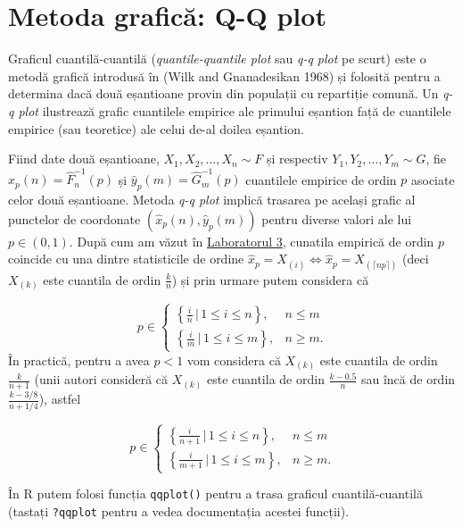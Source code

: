 \documentclass[]{article}
\begin{document}
\section{Metoda grafică: Q-Q plot}\label{metoda-grafica-q-q-plot}

Graficul cuantilă-cuantilă (\emph{quantile-quantile plot} sau \emph{q-q
plot} pe scurt) este o metodă grafică introdusă în (Wilk and
Gnanadesikan 1968) și folosită pentru a determina dacă două eșantioane
provin din populații cu repartiție comună. Un \emph{q-q plot} ilustrează
grafic cuantilele empirice ale primului eșantion față de cuantilele
empirice (sau teoretice) ale celui de-al doilea eșantion.

Fiind date două eșantioane, \(X_1,X_2,\ldots,X_n\sim F\) și respectiv
\(Y_1, Y_2, \ldots, Y_m\sim G\), fie
\(\hat{x}_p(n) = \hat{F}_n^{-1}(p)\) și
\(\hat{y}_p(m) = \hat{G}_m^{-1}(p)\) cuantilele empirice de ordin \(p\)
asociate celor două eșantioane. Metoda \emph{q-q plot} implică trasarea
pe același grafic al punctelor de coordonate
\((\hat{x}_p(n), \hat{y}_p(m))\) pentru diverse valori ale lui
\(p\in(0,1)\). După cum am văzut în
\href{https://alexamarioarei.github.io/Teaching/2017-2018/Instrumente\%20Statistice\%20web\%20page/labs/Lab_3.html}{Laboratorul
3}, cunatila empirică de ordin \(p\) coincide cu una dintre statisticile
de ordine
\(\hat{x}_p = X_{(i)} \iff \hat{x}_p = X_{(\lceil np \rceil)}\) (deci
\(X_{(k)}\) este cuantila de ordin \(\frac{k}{n}\)) și prin urmare putem
considera că

\[
    p\in \left\{\begin{array}{ll}
      \left\{\frac{i}{n}\,|\,1\leq i\leq n\right\}, & n\leq m\\
      \left\{\frac{i}{m}\,|\,1\leq i\leq m\right\}, & n\geq m.
    \end{array}\right.
  \] În practică, pentru a avea \(p<1\) vom considera că \(X_{(k)}\)
este cuantila de ordin \(\frac{k}{n+1}\) (unii autori consideră că
\(X_{(k)}\) este cuantila de ordin \(\frac{k-0.5}{n}\) sau încă de ordin
\(\frac{k-3/8}{n+1/4}\)), astfel

\[
    p\in \left\{\begin{array}{ll}
      \left\{\frac{i}{n+1}\,|\,1\leq i\leq n\right\}, & n\leq m\\
      \left\{\frac{i}{m+1}\,|\,1\leq i\leq m\right\}, & n\geq m.
    \end{array}\right.
  \]

În R putem folosi funcția \texttt{qqplot()} pentru a trasa graficul
cuantilă-cuantilă (tastați \texttt{?qqplot} pentru a vedea documentația
acestei funcții).
\end{document}
